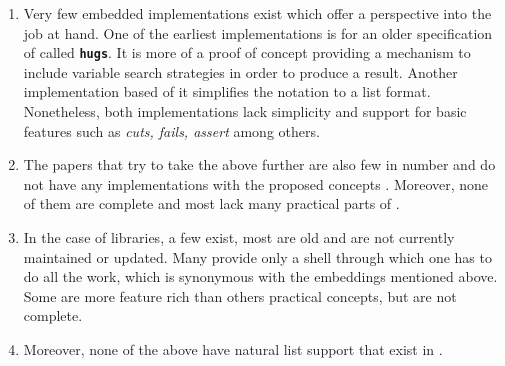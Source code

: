 \documentclass[thesis-solanki.tex]{subfiles}
\begin{document}
\begin{enumerate}
\item
  Very few embedded implementations exist which offer a perspective into the job at hand.
  One of the earliest implementations \cite{website:mini-prolog-hugs98} is for an older specification of
   called  \texttt{\bfseries{hugs}}.
  It is more of a proof of concept providing a mechanism to include variable search strategies in order to produce
  a result.
  Another implementation \cite{website:takashi-workplace} based of it simplifies the notation to a list format.
  Nonetheless, both implementations lack simplicity and support for basic  features such as
  \textit{cuts, fails, assert} among others.

\begin{comment}
\item
  Only two embeddings exist, one of them is old and made for \texttt{\bfseries{hugs}} a functional programming
  system based on the \progLang{Haskell 98} specification.
  It is complex and also lacks a lot of \progLang{Prolog} like features including \textit{cuts, fails, assert}
  among others.
  The second one is based off the first one to make it simple but it loses the variable search strategy support
  which allows the programmer to choose the manner in which a solution is produced.
\end{comment}

\item
  The papers that try to take the above further are also few in number and do not have any implementations with the
  proposed concepts \cite{spivey1999embedding, seres1999algebra, seres2001algebra, spivey2000functional, seres2000optimisation}\yyy{}{)}.
  Moreover, none of them are complete and most lack many practical parts of .

\item
  In the case of libraries, a few exist, most are old and are not currently maintained or updated.
  Many provide only a shell through which one has to
  do all the work, which is synonymous with the
  embeddings mentioned above.
  Some are  more feature rich than others practical  concepts,
  but are  not complete.

\item
  Moreover, none of the above have natural list support that exist
  in .
\end{enumerate}
\end{document}
